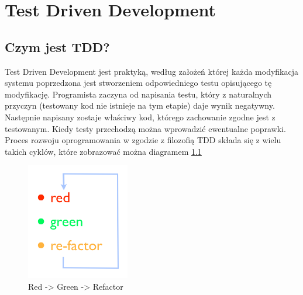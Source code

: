 
\chapter[Test Driven Development]{Test Driven Development}
  \section{Czym jest TDD?}
    Test Driven Development jest praktyką, według założeń której każda modyfikacja systemu poprzedzona jest stworzeniem odpowiedniego testu opisującego tę modyfikację. Programista zaczyna od napisania testu, który z naturalnych przyczyn (testowany kod nie istnieje na tym etapie) daje wynik negatywny. Następnie napisany zostaje właściwy kod, którego zachowanie zgodne jest z testowanym. Kiedy testy przechodzą można wprowadzić ewentualne poprawki.
    Proces rozwoju oprogramowania w zgodzie z filozofią TDD składa się z wielu takich cyklów, które zobrazować można diagramem \ref{red_green_refactor}
    
     \begin{figure}[!h]
   		\begin{center}
   			\includegraphics[width=0.4\textwidth]{images/tdd_red_green_refactor.png}
   			\caption{Red -> Green -> Refactor}
   			\label{red_green_refactor}
   		\end{center}
   	\end{figure}
   	
   	\clearpage
    
